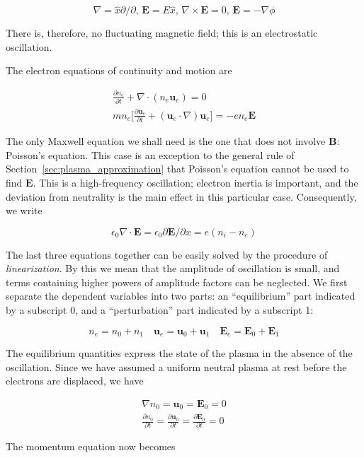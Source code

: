 \documentclass[
  notoc %
]{tufte-book}
\begin{document}
\[
\nabla = \hat{x}\partial/\partial,\, \mathbf{E} = E\hat{x},\, \nabla\times\mathbf{E} =0,\, \mathbf{E}=-\nabla\phi
\]

There is, therefore, no fluctuating magnetic field; this is an
electrostatic oscillation.

The electron equations of continuity and motion are

\[
\begin{aligned}
\frac{\partial n_e}{\partial t} + \nabla\cdot(n_e\mathbf{u}_e) = 0 \\
mn_e\Big[ \frac{\partial \mathbf{u}_e}{\partial t} + (\mathbf{u}_e\cdot\nabla)\mathbf{u}_e \Big] = -en_e\mathbf{E}
\end{aligned}
\]

The only Maxwell equation we shall need is the one that does not involve
\(\mathbf{B}\): Poisson's equation. This case is an exception to the
general rule of Section~\ref{sec:plasma_approximation} that Poisson's
equation cannot be used to find \(\mathbf{E}\). This is a high-frequency
oscillation; electron inertia is important, and the deviation from
neutrality is the main effect in this particular case. Consequently, we
write

\[
\epsilon_0\nabla\cdot\mathbf{E} = \epsilon_0 \partial \mathbf{E}/\partial x = e(n_i - n_e)
\]

The last three equations together can be easily solved by the procedure
of \emph{linearization}. By this we mean that the amplitude of
oscillation is small, and terms containing higher powers of amplitude
factors can be neglected. We first separate the dependent variables into
two parts: an ``equilibrium'' part indicated by a subscript 0, and a
``perturbation'' part indicated by a subscript 1:

\[
n_e = n_0 + n_1\quad \mathbf{u}_e = \mathbf{u}_0 + \mathbf{u}_1\quad \mathbf{E}_e = \mathbf{E}_0 + \mathbf{E}_1
\]

The equilibrium quantities express the state of the plasma in the
absence of the oscillation. Since we have assumed a uniform neutral
plasma at rest before the electrons are displaced, we have

\[
\begin{aligned}
\nabla n_0 = \mathbf{u}_0 = \mathbf{E}_0 = 0 \\
\frac{\partial n_0}{\partial t} = \frac{\partial\mathbf{u}_0}{\partial t} =  \frac{\partial\mathbf{E}_0}{\partial t} = 0
\end{aligned}
\]

The momentum equation now becomes
\end{document}
